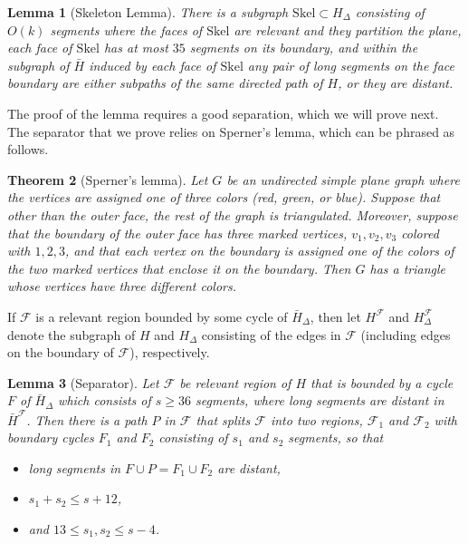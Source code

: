 \documentclass[a4paper,11pt]{article}
\newcommand{\calF}{\mathcal{F}}
\newcommand{\Skel}{\mathrm{Skel}}
\theoremstyle{plain}
\newtheorem{theorem}{Theorem}[section]
\newtheorem{lemma}[theorem]{Lemma}
\newtheorem{identification rule}{Identification Rule}
\theoremstyle{definition}
\theoremstyle{remark}
\begin{document}
\begin{lemma}[Skeleton Lemma]\label{lem:slicedskeleton}
There is a subgraph $\Skel \subset H_\Delta$ consisting of $O(k)$ segments where the faces of $\Skel$ are relevant and they partition the plane, each face of $\Skel$ has at most $35$ segments on its boundary, and within the subgraph of $\bar{H}$ induced by each face of $\Skel$ any pair of long segments on the face boundary are either subpaths of the same directed path of $H$, or they are distant.
\end{lemma}

The proof of the lemma requires a good separation, which we will prove next. The separator that we prove relies on Sperner's lemma, which can be phrased as follows.

\begin{theorem}[Sperner's lemma]
Let $G$ be an undirected simple plane graph where the vertices are assigned one of three colors (red, green, or blue). Suppose that other than the outer face, the rest of the graph is triangulated. Moreover, suppose that the boundary of the outer face has three marked vertices, $v_1,v_2,v_3$ colored with $1,2,3$, and that each vertex on the boundary is assigned one of the colors of the two marked vertices that enclose it on the boundary. Then $G$ has a triangle whose vertices have three different colors.
\end{theorem}

If $\calF$ is a relevant region bounded by some cycle of $\bar{H}_\Delta$, then let $H^\calF$ and $H^\calF_\Delta$ denote the subgraph of $H$ and $H_\Delta$ consisting of the edges in $\calF$ (including edges on the boundary of $\calF$), respectively.

\begin{lemma}[Separator]\label{lem:sperner_sep}
Let $\calF$ be relevant region of $H$ that is bounded by a cycle $F$ of $\bar{H}_\Delta$ which consists of $s\geq 36$ segments, where long segments are distant in $\bar{H}^\calF$. Then there is a path $P$ in $\calF$ that splits $\calF$ into two regions, $\calF_1$ and $\calF_2$ with boundary cycles $F_1$ and $F_2$ consisting of $s_1$ and $s_2$ segments, so that
\begin{itemize}
\item long segments in $F\cup P=F_1\cup F_2$ are distant,
\item $s_1+s_2\leq s+12$,
\item and $13\leq  s_1,s_2 \leq s-4$.
\end{itemize} 
\end{lemma}
\end{document}
